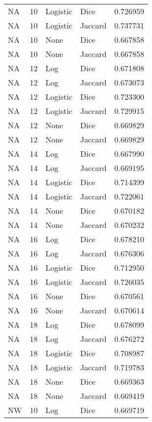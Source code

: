 \documentclass{article}
\begin{document}
\begin{center}
\begin{supertabular}{| l | l | l | l | l |}
            NA & 10 & Logistic & Dice & 0.726959 \\
            NA & 10 & Logistic & Jaccard & 0.737731 \\
            NA & 10 & None & Dice & 0.667858 \\
            NA & 10 & None & Jaccard & 0.667858 \\
            NA & 12 & Log & Dice & 0.671808 \\
            NA & 12 & Log & Jaccard & 0.673073 \\
            NA & 12 & Logistic & Dice & 0.723300 \\
            NA & 12 & Logistic & Jaccard & 0.729915 \\
            NA & 12 & None & Dice & 0.669829 \\
            NA & 12 & None & Jaccard & 0.669829 \\
            NA & 14 & Log & Dice & 0.667990 \\
            NA & 14 & Log & Jaccard & 0.669195 \\
            NA & 14 & Logistic & Dice & 0.714399 \\
            NA & 14 & Logistic & Jaccard & 0.722061 \\
            NA & 14 & None & Dice & 0.670182 \\
            NA & 14 & None & Jaccard & 0.670232 \\
            NA & 16 & Log & Dice & 0.678210 \\
            NA & 16 & Log & Jaccard & 0.676306 \\
            NA & 16 & Logistic & Dice & 0.712950 \\
            NA & 16 & Logistic & Jaccard & 0.726035 \\
            NA & 16 & None & Dice & 0.670561 \\
            NA & 16 & None & Jaccard & 0.670614 \\
            NA & 18 & Log & Dice & 0.678099 \\
            NA & 18 & Log & Jaccard & 0.676272 \\
            NA & 18 & Logistic & Dice & 0.708987 \\
            NA & 18 & Logistic & Jaccard & 0.719783 \\
            NA & 18 & None & Dice & 0.669363 \\
            NA & 18 & None & Jaccard & 0.669419 \\
            NW & 10 & Log & Dice & 0.669719 \\

\end{supertabular}
\end{center}
\end{document}
